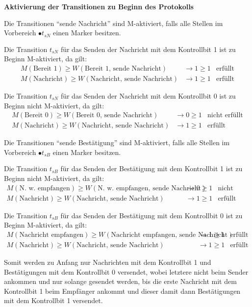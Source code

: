 \documentclass[10pt]{scrartcl}
\begin{document}
\textbf{Aktivierung der Transitionen zu Beginn des Protokolls}

Die Transitionen "`sende Nachricht"' sind M-aktiviert, falls alle Stellen im Vorbereich $\bullet t_{sN}$ einen Marker besitzen.

Die Transition $t_{sN}$ für das Senden der Nachricht mit dem Kontrollbit 1 ist zu Beginn M-aktiviert, da gilt:
\begin{align}
M(\text{Bereit 1}) \geq W(\text{Bereit 1, sende Nachricht}) &\rightarrow 1 \geq 1 & \text{erfüllt} \\
M(\text{Nachricht}) \geq W(\text{Nachricht, sende Nachricht}) &\rightarrow 1 \geq 1 & \text{erfüllt}
\end{align}

Die Transition $t_{sN}$ für das Senden der Nachricht mit dem Kontrollbit 0 ist zu Beginn nicht M-aktiviert, da gilt:
\begin{align}
M(\text{Bereit 0}) \geq W(\text{Bereit 0, sende Nachricht}) &\rightarrow 0 \geq 1 & \text{nicht erfüllt} \\
M(\text{Nachricht}) \geq W(\text{Nachricht, sende Nachricht}) &\rightarrow 1 \geq 1 & \text{erfüllt}
\end{align}

Die Transitionen "`sende Bestätigung"' sind M-aktiviert, falls alle Stellen im Vorbereich $\bullet t_{sB}$ einen Marker besitzen.

Die Transition $t_{sB}$ für das Senden der Bestätigung mit dem Kontrollbit 1 ist zu Beginn nicht M-aktiviert, da gilt:
\begin{align}
M(\text{N. w. empfangen}) \geq W(\text{N. w. empfangen, sende Nachricht}) &\rightarrow 0 \geq 1 & \text{nicht erfüllt} \\
M(\text{Nachricht}) \geq W(\text{Nachricht, sende Nachricht}) &\rightarrow 1 \geq 1 & \text{erfüllt}
\end{align}

Die Transition $t_{sB}$ für das Senden der Bestätigung mit dem Kontrollbit 0 ist zu Beginn M-aktiviert, da gilt:
\begin{align}
M(\text{Nachricht empfangen}) \geq W(\text{Nachricht empfangen, sende Nachricht}) &\rightarrow 1 \geq 1 & \text{erfüllt} \\
M(\text{Nachricht}) \geq W(\text{Nachricht, sende Nachricht}) &\rightarrow 1 \geq 1 & \text{erfüllt}
\end{align}

Somit werden zu Anfang nur Nachrichten mit dem Kontrollbit 1 und Bestätigungen mit dem Kontrollbit 0 versendet, wobei letztere nicht beim Sender ankommen und nur solange gesendet werden, bis die erste Nachricht mit dem Kontrollbit 1 beim Empfänger ankommt und dieser damit dann Bestätigungen mit dem Kontrollbit 1 versendet.
\end{document}
